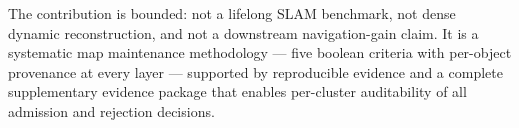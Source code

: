 \documentclass[journal]{IEEEtran}
\begin{document}
The contribution is bounded: not a lifelong SLAM benchmark, not dense dynamic reconstruction, and not a downstream navigation-gain claim. It is a systematic map maintenance methodology --- five boolean criteria with per-object provenance at every layer --- supported by reproducible evidence and a complete supplementary evidence package that enables per-cluster auditability of all admission and rejection decisions.

\clearpage
\balance



\end{document}
